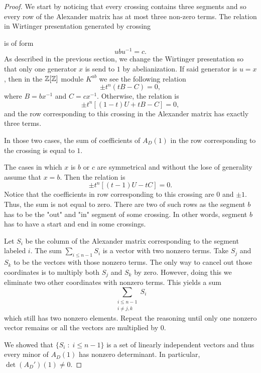 \begin{proof}
  We start by noticing that every crossing contains three segments and so every row of the Alexander matrix has at most three non-zero terms. The relation in Wirtinger presentation generated by crossing 
  \begin{center}
  \end{center}
  is of form
  $$ubu^{-1}=c.$$
  As described in the previous section, we change the Wirtinger presentation so that only one generator $x$ is send to $1$ by abelianization. If said generator is $u=x$, then in the $\operatorname{\mathbb{Z}}[\operatorname{\mathbb{Z}}]$ module $K^{ab}$ we see the following relation 
  $$\pm t^n(tB-C)=0,$$
  where $B=bx^{-1}$ and $C=cx^{-1}$. Otherwise, the relation is
  $$\pm t^n[(1-t)U+tB-C]=0,$$
  and the row corresponding to this crossing in the Alexander matrix has exactly three terms.

  In those two cases, the sum of coefficients of $A_D(1)$ in the row corresponding to the crossing is equal to $1$.

  The cases in which $x$ is $b$ or $c$ are symmetrical and without the lose of generality assume that $x=b$. Then the relation is 
  $$\pm t^n[(t-1)U-tC]=0.$$
  Notice that the coefficients in row corresponding to this crossing are $0$ and $\pm1$. Thus, the sum is not equal to zero. There are two of such rows as the segment $b$ has to be the "out" and "in" segment of some crossing. In other words, segment $b$ has to have a start and end in some crossings.

  Let $S_i$ be the column of the Alexander matrix corresponding to the segment labeled $i$. The sum $\sum_{i\leq n-1} S_i$ is a vector with two nonzero terms. Take $S_j$ and $S_k$ to be the vectors with those nonzero terms. The only way to cancel out those coordinates is to multiply both $S_j$ and $S_k$ by zero. However, doing this we eliminate two other coordinates with nonzero terms. This yields a sum
  $$\sum_{\substack{i\leq n-1 \\ i\neq j,k}}S_i$$ 
  which still has two nonzero elements. Repeat the reasoning until only one nonzero vector remains or all the vectors are multiplied by $0$.

  We showed that $\{S_i\;:\;i\leq n-1\}$ is a set of linearly independent vectors and thus every minor of $A_D(1)$ has nonzero determinant. In particular, $\det(A_D')(1)\neq 0$.
\end{proof}


